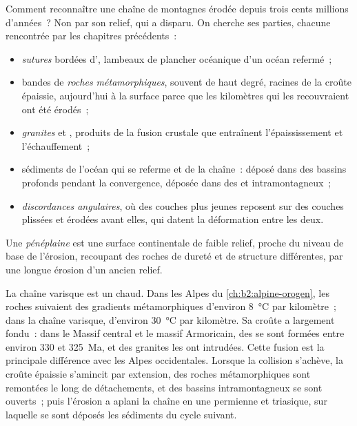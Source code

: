 Comment reconnaître une chaîne de montagnes érodée depuis trois cents millions d'années~?
Non par son relief, qui a disparu. On cherche ses parties, chacune rencontrée par les
chapitres précédents~:
\begin{itemize}
\item \emph{sutures} bordées d'\emph{}, lambeaux de plancher océanique d'un océan refermé~;
\item bandes de \emph{roches métamorphiques}, souvent de haut degré, racines de la croûte épaissie,
aujourd'hui à la surface parce que les kilomètres qui les recouvraient ont été érodés~;
\item \emph{granites} et \emph{}, produits de la fusion crustale que
entraînent l'épaississement et l'échauffement~;
\item sédiments de l'océan qui se referme et de la chaîne~: \emph{} déposé dans des bassins profonds
pendant la convergence, \emph{} déposée dans des  et intramontagneux~;
\item \emph{discordances angulaires}, où des couches plus jeunes reposent sur des couches plissées et
érodées avant elles, qui datent la déformation entre les deux.
\end{itemize}

\begin{definition}[Pénéplaine]\label{def:b2:wilson-cycle:peneplain}
Une \emph{pénéplaine} est une surface continentale de faible relief, proche du niveau de base de
l'érosion, recoupant des roches de dureté et de structure différentes, par une longue érosion d'un ancien
relief.
\end{definition}

La chaîne varisque est un  chaud. Dans les Alpes du \cref{ch:b2:alpine-orogen}, les roches
suivaient des gradients métamorphiques d'environ \qty{8}{\celsius} par kilomètre~; dans la chaîne varisque,
d'environ \qty{30}{\celsius} par kilomètre. Sa croûte a largement fondu~: dans le Massif central
et le massif Armoricain, des  se sont formées entre environ 330 et 325~Ma, et des
granites les ont intrudées. Cette fusion est la principale différence avec les Alpes occidentales. Lorsque la
collision s'achève, la croûte épaissie s'amincit par extension, des roches métamorphiques sont remontées
le long de détachements, et des bassins intramontagneux se sont ouverts~; puis l'érosion a aplani la chaîne en
une  permienne et triasique, sur laquelle se sont déposés les sédiments du cycle suivant.

